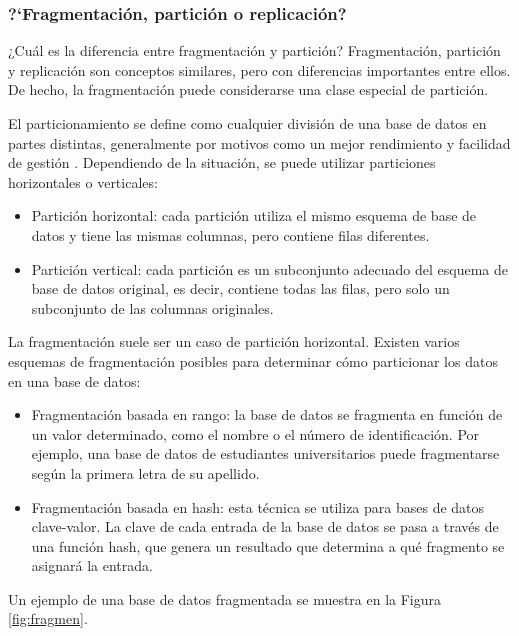  
\subsubsection{?`Fragmentación, partición o replicación?}
 
  ¿Cuál es la diferencia entre fragmentación y partición? Fragmentación, partición y replicación son conceptos similares, pero con diferencias importantes entre ellos. De hecho, la fragmentación puede considerarse una clase especial de partición.
 
 El particionamiento se define como cualquier división de una base de datos en partes distintas, generalmente por motivos como un mejor rendimiento y facilidad de gestión   . Dependiendo de la situación, se puede utilizar particiones horizontales o verticales:
 
 \begin{itemize}
 	\item   Partición horizontal: cada partición utiliza el mismo esquema de base de datos y tiene las mismas columnas, pero contiene filas diferentes.
 	\item Partición vertical: cada partición es un subconjunto adecuado del esquema de base de datos original, es decir, contiene todas las filas, pero solo un subconjunto de las columnas originales.
 	
 \end{itemize}

 La fragmentación suele ser un caso de partición horizontal. Existen varios esquemas de fragmentación posibles para determinar cómo particionar los datos en una base de datos:
 \begin{itemize}
 	\item Fragmentación basada en rango: la base de datos se fragmenta en función de un valor determinado, como el nombre o el número de identificación. Por ejemplo, una base de datos de estudiantes universitarios puede fragmentarse según la primera letra de su apellido.
 	\item  Fragmentación basada en hash: esta técnica se utiliza para bases de datos clave-valor. La clave de cada entrada de la base de datos se pasa a través de una función hash, que genera un resultado que determina a qué fragmento se asignará la entrada.
 \end{itemize}
 
Un ejemplo de una base de datos fragmentada se muestra en la Figura \ref{fig:fragmen}.
 

